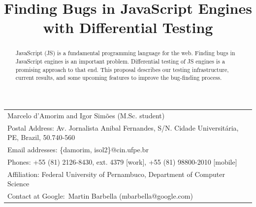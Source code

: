 \documentclass[11pt]{article}
\begin{document}
\title{Finding Bugs in JavaScript Engines with Differential Testing}
\author{}
\date{}


\makeatletter
\def\maketitle{%
  \par{\centering\large\textbf{\@title}\normalsize\par}\vspace{3ex}%
  \par{\@author}%
  \par}
\makeatother

\maketitle

\vspace{-2ex}
\small    
\begin{table}[h!] 
  \centering%
  \begin{tabular*}{.85\linewidth}{l}

    Marcelo d'Amorim and Igor Sim\~oes (M.Sc. student)\\
    
    Postal Address: Av. Jornalista Anibal Fernandes, S/N. Cidade
    Universit\'aria, PE, Brazil, 50.740-560 \\
    
    Email addresses: \{damorim, isol2\}@cin.ufpe.br\\

    Phones: +55 (81) 2126-8430,
    ext. 4379 [work], +55 (81) 98800-2010 [mobile]\\

    Affiliation: Federal University of Pernambuco, Department of
    Computer Science\\

    Contact at Google:~Martin Barbella (mbarbella@google.com)

  \end{tabular*}
\end{table}
\normalsize

\vspace{-2ex}
\begin{abstract}
JavaScript (JS) is a fundamental programming language for the
web. Finding bugs in JavaScript engines is an important
problem. Differential testing of JS engines is a promising approach to
that end. This proposal describes our testing infrastructure, current
results, and some upcoming features to improve the bug-finding
process.
\end{abstract}
\end{document}
